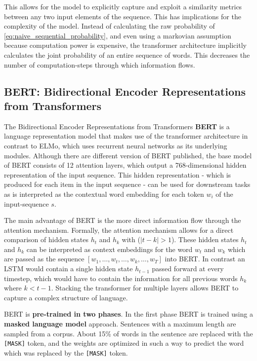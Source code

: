 \documentclass[a4paper,12pt,oneside,openright]{report}
\begin{document}
This allows for the model to explicitly capture and exploit a similarity metrics between any two input elements of the sequence.
This has implications for the complexity of the model.
Instead of calculating the raw probability of \eqref{eq:naive_sequential_probability}, and even using a markovian assumption because computation power is expensive, the transformer architecture implicitly calculates the joint probability of an entire sequence of words.
This decreases the number of computation-steps through which information flows. \\

\subsection{BERT: Bidirectional Encoder Representations from Transformers}\label{section:BERT}
 
The Bidirectional Encoder Representations from Transformers \textbf{BERT} \cite{devlin18} is a language representation model that makes use of the transformer architecture in contrast to ELMo, which uses recurrent neural networks as its underlying modules.
Although there are different version of BERT published, the base model of BERT consists of 12 attention layers, which output a 768-dimensional hidden representation of the input sequence.
This hidden representation - which is produced for each item in the input sequence - can be used for downstream tasks as is interpreted as the contextual word embedding for each token $w_i$ of the input-sequence $s$.

The main advantage of BERT is the more direct information flow through the attention mechanism. 
Formally, the attention mechanism allows for a direct comparison of hidden states $h_t$ and $h_k$ with ($|t - k| > 1$).
These hidden states $h_t$ and $h_k$ can be interpreted as context  embeddings for the word $w_t$ and $w_k$ which are passed as the sequence $[w_1, \ldots, w_t, \ldots, w_k, \ldots, w_T]$ into BERT.
In contrast  an LSTM would contain a single hidden state $h_{t-1}$ passed forward at every timestep, which would have to contain the information for all previous words $h_k$ where $k < t - 1$.
Stacking the transformer for multiple layers allows BERT to capture a complex structure of language.

BERT is \textbf{pre-trained in two phases}. 
In the first phase BERT is trained using a \textbf{masked language model} approach. 
Sentences with a maximum length are sampled from a corpus.
About 15\% of words in the sentence are replaced with the \texttt{[MASK]} token, and the weights are optimized in such a way to predict the word which was replaced by the \Verb#[MASK]# token.
\end{document}
